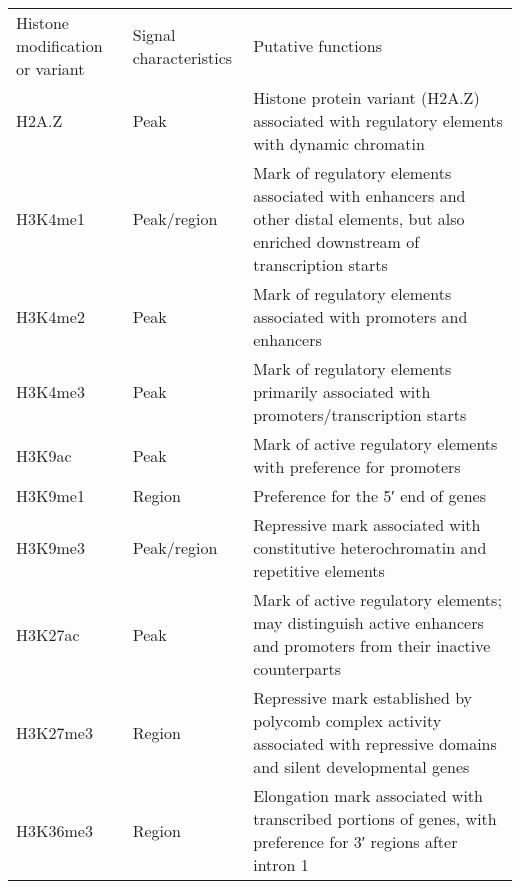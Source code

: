 \begin{table}[h]
   \footnotesize
   \begin{tabular}{l l p{5cm}}
Histone modification or variant & Signal characteristics & Putative functions                                                                                                                    \\
H2A.Z                           & Peak                   & Histone protein variant (H2A.Z) associated with regulatory elements with dynamic chromatin                                            \\
H3K4me1                         & Peak/region            & Mark of regulatory elements associated with enhancers and other distal elements, but also enriched downstream of transcription starts \\
H3K4me2                         & Peak                   & Mark of regulatory elements associated with promoters and enhancers                                                                   \\
H3K4me3                         & Peak                   & Mark of regulatory elements primarily associated with promoters/transcription starts                                                  \\
H3K9ac                          & Peak                   & Mark of active regulatory elements with preference for promoters                                                                      \\
H3K9me1                         & Region                 & Preference for the 5′ end of genes                                                                                                    \\
H3K9me3                         & Peak/region            & Repressive mark associated with constitutive heterochromatin and repetitive elements                                                  \\
H3K27ac                         & Peak                   & Mark of active regulatory elements; may distinguish active enhancers and promoters from their inactive counterparts                   \\
H3K27me3                        & Region                 & Repressive mark established by polycomb complex activity associated with repressive domains and silent developmental genes            \\
H3K36me3                        & Region                 & Elongation mark associated with transcribed portions of genes, with preference for 3′ regions after intron 1                          \\

\end{tabular}
\end{table}
